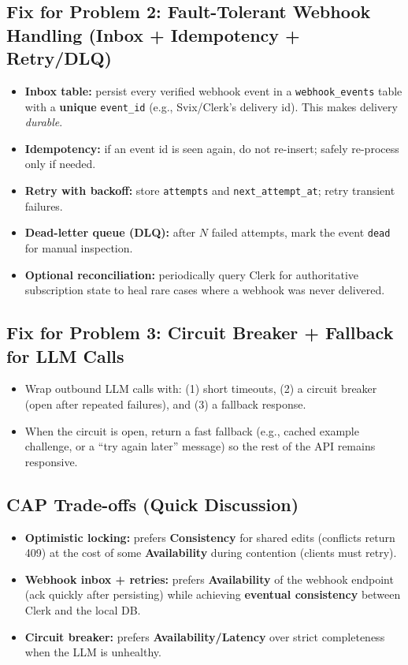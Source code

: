\documentclass[11pt]{article}
\begin{document}
\subsection*{Fix for Problem 2: Fault-Tolerant Webhook Handling (Inbox + Idempotency + Retry/DLQ)}
\begin{itemize}
  \item \textbf{Inbox table:} persist every verified webhook event in a \texttt{webhook\_events} table with a \textbf{unique} \texttt{event\_id}
  (e.g., Svix/Clerk's delivery id). This makes delivery \emph{durable}.
  \item \textbf{Idempotency:} if an event id is seen again, do not re-insert; safely re-process only if needed.
  \item \textbf{Retry with backoff:} store \texttt{attempts} and \texttt{next\_attempt\_at}; retry transient failures.
  \item \textbf{Dead-letter queue (DLQ):} after $N$ failed attempts, mark the event \texttt{dead} for manual inspection.
  \item \textbf{Optional reconciliation:} periodically query Clerk for authoritative subscription state to heal rare cases where
  a webhook was never delivered.
\end{itemize}

\subsection*{Fix for Problem 3: Circuit Breaker + Fallback for LLM Calls}
\begin{itemize}
  \item Wrap outbound LLM calls with: (1) short timeouts, (2) a circuit breaker (open after repeated failures),
  and (3) a fallback response.
  \item When the circuit is open, return a fast fallback (e.g., cached example challenge, or a ``try again later'' message)
  so the rest of the API remains responsive.
\end{itemize}

\subsection*{CAP Trade-offs (Quick Discussion)}
\begin{itemize}
  \item \textbf{Optimistic locking:} prefers \textbf{Consistency} for shared edits (conflicts return 409) at the cost of some \textbf{Availability}
  during contention (clients must retry).
  \item \textbf{Webhook inbox + retries:} prefers \textbf{Availability} of the webhook endpoint (ack quickly after persisting)
  while achieving \textbf{eventual consistency} between Clerk and the local DB.
  \item \textbf{Circuit breaker:} prefers \textbf{Availability/Latency} over strict completeness when the LLM is unhealthy.
\end{itemize}
\end{document}
